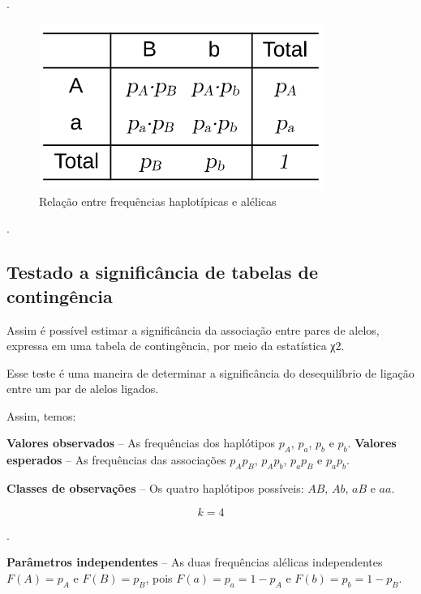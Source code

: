 \documentclass[
]{book}
\begin{document}
.\linebreak

\begin{figure}

{\centering \includegraphics[width=350px]{figs/freq_haplotipica_esperada} 

}

\caption{Relação entre frequências haplotípicas e alélicas}\label{fig:freqhapesp}
\end{figure}

.\linebreak

\hypertarget{testado-a-significuxe2ncia-de-tabelas-de-continguxeancia}{%
\subsection{Testado a significância de tabelas de contingência}\label{testado-a-significuxe2ncia-de-tabelas-de-continguxeancia}}

Assim é possível estimar a significância da associação entre pares de alelos, expressa em uma tabela de contingência, por meio da estatística χ2.

Esse teste é uma maneira de determinar a significância do desequilíbrio de ligação entre um par de alelos ligados.

Assim, temos:

\textbf{Valores observados} -- As frequências dos haplótipos \(p_A\), \(p_a\), \(p_b\) e \(p_b\).
\textbf{Valores esperados} -- As frequências das associações \(p_A p_B\), \(p_A p_b\), \(p_a p_B\) e \(p_a p_b\).

\textbf{Classes de observações} -- Os quatro haplótipos possíveis: \(AB\), \(Ab\), \(aB\) e \(aa\).

\[k=4\]

.\linebreak

\textbf{Parâmetros independentes} -- As duas frequências alélicas independentes \(F(A)=p_A\) e \(F(B)=p_B\), pois \(F(a)=p_a=1-p_A\) e \(F(b)=p_b=1-p_B\).
\end{document}
